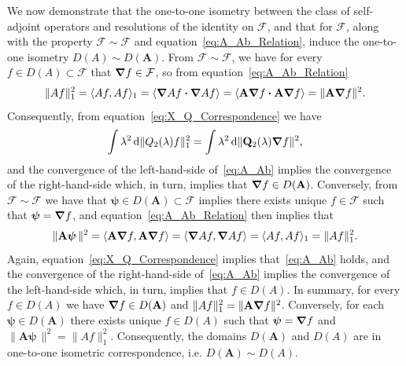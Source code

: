 \documentclass[leqno,onefignum,onetabnum]{siamltex1213}
\renewcommand{\d}{\mathrm{d}}
\newcommand{\Ab}{\mathbf{A}}
\newcommand{\Qb}{\mathbf{Q}}
\newcommand{\Fc}{\mathcal{F}}
\newcommand{\Fs}{\mathscr{F}}
\newcommand\bnabla{\mbox{\boldmath${\nabla}$}}
\providecommand\bcdot{\boldsymbol{\cdot}}
\newcommand{\vecpsi}{\boldsymbol{\psi}}
\begin{document}
We now demonstrate that the one-to-one isometry between the class of
self-adjoint operators and resolutions of the identity on $\Fs$, and
that for $\Fc$, along with the property $\Fs\sim\Fc$ and
equation~\eqref{eq:A_Ab_Relation}, induce the one-to-one isometry 
$D(A)\sim D(\Ab)$. From $\Fs\sim\Fc$, we have for every $f\in D(A)\subset\Fs$ that 
$\bnabla f\in\Fc$, so from equation~\eqref{eq:A_Ab_Relation} 
%
\begin{align}\label{eq:Norm_A_Ab}
  \|Af\|_1^2=\langle Af,Af\rangle_1
        =\langle\bnabla  A f\bcdot\bnabla  A f\rangle
        =\langle\Ab\bnabla f\bcdot\Ab\bnabla f\rangle
        =\|\Ab\bnabla f\|^2.
\end{align}
%
Consequently, from equation~\eqref{eq:X_Q_Correspondence} we have 
%
\begin{align}\label{eq:A_Ab}
  \int\lambda^2\,\d\|Q_2(\lambda)f\|_1^2=\int\lambda^2\,\d\|\Qb_2(\lambda)\bnabla f\|^2,
\end{align}
%
and the convergence of the left-hand-side of~\eqref{eq:A_Ab} implies
the convergence of the right-hand-side which, in turn, implies that
$\bnabla f\in D(\Ab)$. Conversely, from $\Fs\sim\Fc$ we have that $\vecpsi\in
D(\Ab)\subset\Fc$ implies there exists  
unique $f\in\Fs$ such that $\vecpsi=\bnabla f$, and
equation~\eqref{eq:A_Ab_Relation} then implies that    
%
\begin{align}
  \|\Ab\vecpsi\,\|^2=\langle\Ab\bnabla f,\Ab\bnabla f\rangle
         =\langle\bnabla  A f,\bnabla  A f\rangle
         =\langle Af,Af\rangle_1
         =\|Af\|_1^2.
\end{align}
%
Again, equation~\eqref{eq:X_Q_Correspondence} implies
that~\eqref{eq:A_Ab} holds, and the convergence of the right-hand-side
of~\eqref{eq:A_Ab} implies the 
convergence of the left-hand-side which, in turn, implies that
$f\in D(A)$. In summary, for every $f\in
D(A)$ we have $\bnabla f\in D(\Ab)$ and
$\|Af\|_1^2=\|\Ab\bnabla f\|^2$. Conversely, for each $\vecpsi\in D(\Ab)$ there
exists unique $f\in D(A)$ such that $\vecpsi=\bnabla f$ and
$\|\Ab\vecpsi\,\|^2=\|Af\|_1^2$. Consequently, the domains $D(\Ab)$ and $D(A)$
are in one-to-one isometric correspondence, i.e. $D(\Ab)\sim D(A)$.     
\end{document}

